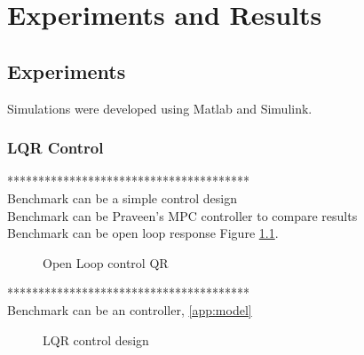 \chapter{Experiments and Results}\label{ch:results}

\section{Experiments}
Simulations were developed using Matlab and Simulink.\\



\subsection{LQR Control}

***************************************\\
Benchmark can be a simple control design \\
Benchmark can be Praveen's MPC controller to compare results \\
Benchmark can be open loop response Figure \ref{fig:QROL}.\\
\begin{figure}[h!]
	\centering
	\caption{Open Loop control QR \label{fig:QROL}}
\end{figure}

***************************************\\

Benchmark can be an  controller, \ref{app:model}
\begin{figure}[h!]
	\centering
	\caption{LQR control design\label{fig:}}
\end{figure}		




